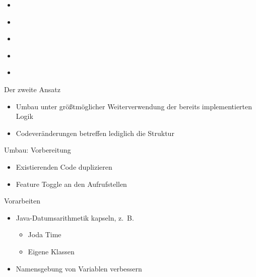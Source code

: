 \begin{frame}[t,fragile]{}
\begin{itemize}
\item
\end{itemize}
\end{frame}

\begin{frame}[t,fragile]{}
\begin{itemize}
\item
\end{itemize}
\end{frame}

\begin{frame}[t,fragile]{}
\begin{itemize}
\item
\end{itemize}
\end{frame}

\begin{frame}[t,fragile]{}
\begin{itemize}
\item
\end{itemize}
\end{frame}

\begin{frame}[t,fragile]{}
\begin{itemize}
\item
\end{itemize}
\end{frame}

\begin{frame}[t,fragile]{Der zweite Ansatz}
\begin{itemize}
\item Umbau unter größtmöglicher Weiterverwendung der bereits implementierten Logik
\item Codeveränderungen betreffen lediglich die Struktur
\end{itemize}
\end{frame}

\begin{frame}[t,fragile]{Umbau: Vorbereitung}
\begin{itemize}
\item Existierenden Code duplizieren
\item Feature Toggle an den Aufrufstellen
\end{itemize}
\end{frame}
 
\begin{frame}[t,fragile]{Vorarbeiten}
\begin{itemize}
\item Java-Datumsarithmetik kapseln, z.~B.
\begin{itemize}
\item Joda Time
\item Eigene Klassen
\end{itemize}
\item Namensgebung von Variablen verbessern
\end{itemize}
\end{frame}

